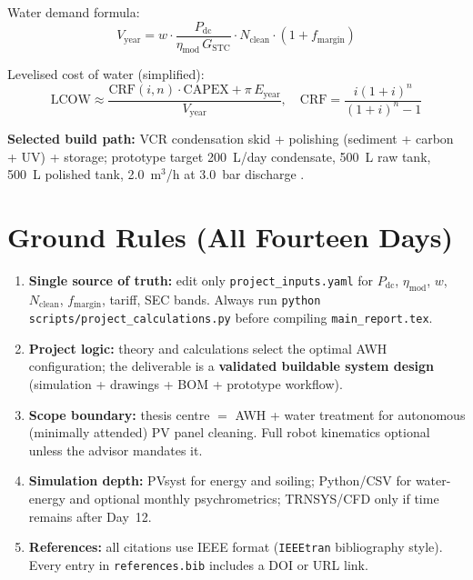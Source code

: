 \documentclass[11pt,a4paper]{article}
\begin{document}
Water demand formula:
\begin{equation}\label{eq:vyr}
V_{\mathrm{year}} = w \cdot \frac{P_{\mathrm{dc}}}{\eta_{\mathrm{mod}}\,G_{\mathrm{STC}}} \cdot N_{\mathrm{clean}} \cdot (1 + f_{\mathrm{margin}})
\end{equation}

Levelised cost of water (simplified):
\begin{equation}\label{eq:lcow}
\mathrm{LCOW} \approx \frac{\mathrm{CRF}(i,n)\cdot\mathrm{CAPEX} + \pi\,E_{\mathrm{year}}}{V_{\mathrm{year}}},
\quad
\mathrm{CRF} = \frac{i(1+i)^n}{(1+i)^n - 1}
\end{equation}

\textbf{Selected build path:} VCR condensation skid + polishing (sediment + carbon + UV) + storage; prototype target 200~L/day condensate, 500~L raw tank, 500~L polished tank, 2.0~m$^3$/h at 3.0~bar discharge \cite{bagheri2024sec,alqaed2023awg}.

\section{Ground Rules (All Fourteen Days)}
\begin{enumerate}[leftmargin=*]
  \item \textbf{Single source of truth:} edit only \texttt{project\_inputs.yaml} for $P_{\mathrm{dc}}$, $\eta_{\mathrm{mod}}$, $w$, $N_{\mathrm{clean}}$, $f_{\mathrm{margin}}$, tariff, SEC bands. Always run \texttt{python scripts/project\_calculations.py} before compiling \texttt{main\_report.tex}.
  \item \textbf{Project logic:} theory and calculations select the optimal AWH configuration; the deliverable is a \textbf{validated buildable system design} (simulation + drawings + BOM + prototype workflow).
  \item \textbf{Scope boundary:} thesis centre $=$ AWH + water treatment for autonomous (minimally attended) PV panel cleaning. Full robot kinematics optional unless the advisor mandates it.
  \item \textbf{Simulation depth:} PVsyst for energy and soiling; Python/CSV for water-energy and optional monthly psychrometrics; TRNSYS/CFD only if time remains after Day~12.
  \item \textbf{References:} all citations use IEEE format (\texttt{IEEEtran} bibliography style). Every entry in \texttt{references.bib} includes a DOI or URL link.
\end{enumerate}
\end{document}
